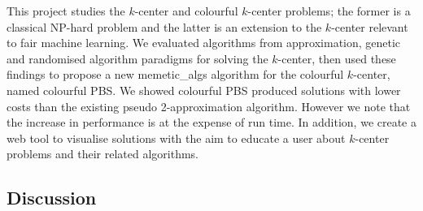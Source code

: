 This project studies the $k$-center and colourful $k$-center problems; the former is a classical NP-hard problem and the latter is an extension to the $k$-center relevant to fair machine learning. We evaluated algorithms from approximation, genetic and randomised algorithm paradigms for solving the $k$-center, then used these findings to propose a new \gls{memetic_algs} algorithm for the colourful $k$-center, named colourful PBS. We showed colourful PBS produced solutions with lower costs than the existing pseudo 2-approximation algorithm. However we note that the increase in performance is at the expense of run time. In addition, we create a web tool to visualise solutions with the aim to educate a user about $k$-center problems and their related algorithms. 

\subsection{Discussion}
